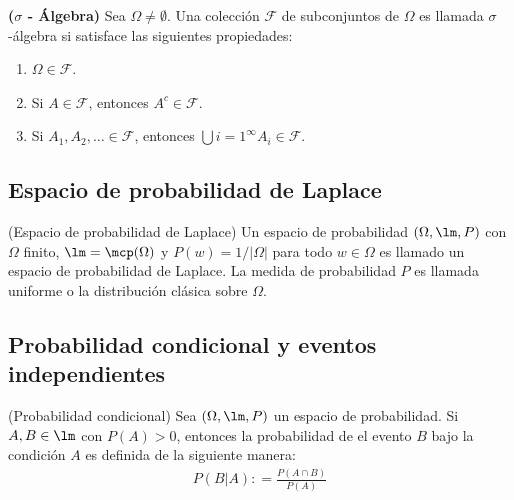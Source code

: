 \begin{definition}{\bf ($\sigma$ - \'Algebra)}
    Sea $\Omega\neq\emptyset$. Una colecci\'on $\mathcal{F}$ de subconjuntos de $\Omega$ es llamada $\sigma$-\'algebra si satisface las siguientes propiedades:
    \begin{enumerate}
        \item $\Omega\in\mathcal{F}$.
        \item Si $A\in\mathcal{F}$, entonces $A^{c}\in\mathcal{F}$.
        \item Si $A_{1},A_{2},\ldots\in\mathcal{F}$, entonces $\bigcup{i=1}^{\infty}A_{i}\in\mathcal{F}$.
    \end{enumerate}
\end{definition}

\subsection{Espacio de probabilidad de Laplace}

\begin{definition}(Espacio de probabilidad de Laplace)
Un espacio de probabilidad $(\Omega, \lm,P)$ con $\Omega$ finito, $\lm = \mcp(\Omega)$ y $P(w) = 1/|\Omega|$
 para todo $w\in \Omega$ es llamado un espacio de probabilidad de Laplace. La medida de probabilidad $P$ es llamada uniforme o la distribuci\'on cl\'asica 
 sobre $\Omega$.
\end{definition}

\subsection{Probabilidad condicional y eventos independientes}

\begin{definition}(Probabilidad condicional)
    Sea $(\Omega, \lm, P)$ un espacio de probabilidad. Si $A,B\in \lm$ con $P(A)>0$, entonces la probabilidad de el evento $B$ bajo la condici\'on $A$ es definida de la siguiente manera:
    \begin{align}
        P(B|A) \colon = \frac{P(A\cap B)}{P(A)}
    \end{align}
\end{definition}

